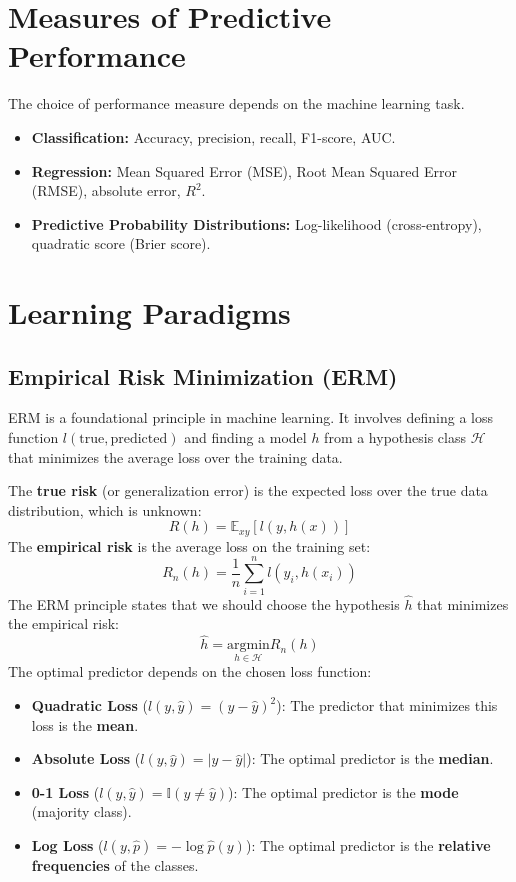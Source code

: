 \documentclass{article}
\begin{document}
\begin{multicols}{2}
\section{Measures of Predictive Performance}
The choice of performance measure depends on the machine learning task.
\begin{itemize}
    \item \textbf{Classification:} Accuracy, precision, recall, F1-score, AUC.
    \item \textbf{Regression:} Mean Squared Error (MSE), Root Mean Squared Error (RMSE), absolute error, $R^2$.
    \item \textbf{Predictive Probability Distributions:} Log-likelihood (cross-entropy), quadratic score (Brier score).
\end{itemize}

\section{Learning Paradigms}
\subsection{Empirical Risk Minimization (ERM)}
ERM is a foundational principle in machine learning. It involves defining a loss function $l(\text{true}, \text{predicted})$ and finding a model $h$ from a hypothesis class $\mathcal{H}$ that minimizes the average loss over the training data.

The \textbf{true risk} (or generalization error) is the expected loss over the true data distribution, which is unknown:
$$ R(h) = \mathbb{E}_{xy}[l(y, h(x))] $$
The \textbf{empirical risk} is the average loss on the training set:
$$ R_n(h) = \frac{1}{n} \sum_{i=1}^{n} l(y_i, h(x_i)) $$
The ERM principle states that we should choose the hypothesis $\hat{h}$ that minimizes the empirical risk:
$$ \hat{h} = \underset{h \in \mathcal{H}}{\text{argmin}} R_n(h) $$
The optimal predictor depends on the chosen loss function:
\begin{itemize}
    \item \textbf{Quadratic Loss} ($l(y, \hat{y}) = (y - \hat{y})^2$): The predictor that minimizes this loss is the \textbf{mean}.
    \item \textbf{Absolute Loss} ($l(y, \hat{y}) = |y - \hat{y}|$): The optimal predictor is the \textbf{median}.
    \item \textbf{0-1 Loss} ($l(y, \hat{y}) = \mathbb{I}(y \neq \hat{y})$): The optimal predictor is the \textbf{mode} (majority class).
    \item \textbf{Log Loss} ($l(y, \hat{p}) = -\log \hat{p}(y)$): The optimal predictor is the \textbf{relative frequencies} of the classes.
\end{itemize}


\end{multicols}
\end{document}
